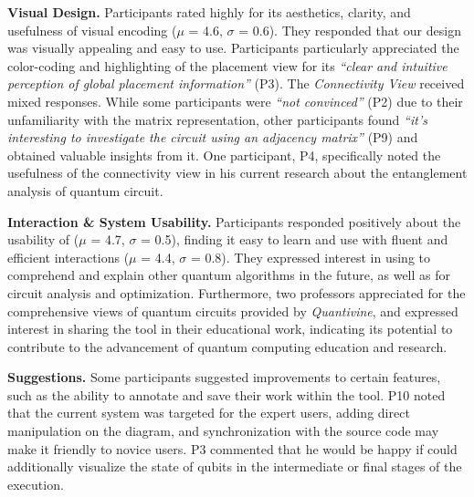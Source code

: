 \textbf{Visual Design.}
Participants rated {\tname} highly for its aesthetics, clarity, and usefulness of visual encoding ($\mu$ = 4.6, $\sigma$ = 0.6).
They responded that our design was visually appealing and easy to use.
Participants particularly appreciated the color-coding and highlighting of the placement view for its \emph{``clear and intuitive perception of global placement information''} (P3).
The \emph{Connectivity View} received mixed responses. 
While some participants were \emph{``not convinced''} (P2) due to their unfamiliarity with the matrix representation, other participants found \emph{``it's interesting to investigate the circuit using an adjacency matrix''} (P9) and obtained valuable insights from it.
One participant, P4, specifically noted the usefulness of the connectivity view in his current research about the entanglement analysis of quantum circuit.


\textbf{Interaction \& System Usability.}
Participants responded positively about the usability of {\tname} ($\mu$ = 4.7, $\sigma$ = 0.5), finding it easy to learn and use with fluent and efficient interactions ($\mu$ = 4.4, $\sigma$ = 0.8).
They expressed interest in using {\tname} to comprehend and explain other quantum algorithms in the future, as well as for circuit analysis and optimization.
Furthermore, two professors appreciated for the comprehensive views of quantum circuits provided by \emph{Quantivine}, and expressed interest in sharing the tool in their educational work, indicating its potential to contribute to the advancement of quantum computing education and research.


\textbf{Suggestions.}
Some participants suggested improvements to certain features, such as the ability to annotate and save their work within the tool.
P10 noted that the current system was targeted for the expert users, adding direct manipulation on the diagram, and synchronization with the source code may make it friendly to novice users.
P3 commented that he would be happy if {\tname} could additionally visualize the state of qubits in the intermediate or final stages of the execution.
